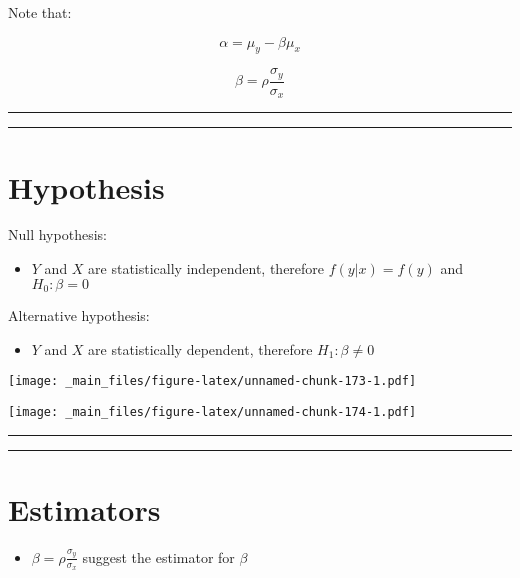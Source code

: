 \documentclass[
]{book}
\providecommand{\tightlist}{%
  \setlength{\itemsep}{0pt}\setlength{\parskip}{0pt}}
\begin{document}
Note that:

\[\alpha=\mu_y-\beta\mu_x\]

\[\beta=\rho\frac{\sigma_y}{\sigma_x}\]

\begin{center}\rule{0.5\linewidth}{0.5pt}\end{center}

\begin{center}\rule{0.5\linewidth}{0.5pt}\end{center}

\hypertarget{hypothesis-6}{%
\section{Hypothesis}\label{hypothesis-6}}

Null hypothesis:

\begin{itemize}
\tightlist
\item
  \(Y\) and \(X\) are statistically independent, therefore \(f(y|x)=f(y)\) and \(H_0: \beta=0\)
\end{itemize}

Alternative hypothesis:

\begin{itemize}
\tightlist
\item
  \(Y\) and \(X\) are statistically dependent, therefore \(H_1: \beta\neq 0\)
\end{itemize}

\texttt{[image: \_main\_files/figure-latex/unnamed-chunk-173-1.pdf]}

\texttt{[image: \_main\_files/figure-latex/unnamed-chunk-174-1.pdf]}

\begin{center}\rule{0.5\linewidth}{0.5pt}\end{center}

\begin{center}\rule{0.5\linewidth}{0.5pt}\end{center}

\hypertarget{estimators-1}{%
\section{Estimators}\label{estimators-1}}

\begin{itemize}
\tightlist
\item
  \(\beta=\rho\frac{\sigma_y}{\sigma_x}\) suggest the estimator for \(\beta\)
\end{itemize}
\end{document}
